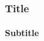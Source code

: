 \documentclass[aspectratio=169,11pt,usenames,dvipsnames]{beamer}
\begin{document}
\begin{frame}
    \frametitle{Title}
    \framesubtitle{Subtitle}
\end{frame}





\end{document}

